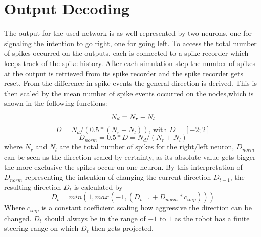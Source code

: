 \section{Output Decoding}\label{sec:OutputDecoding}
The output for the used network is as well represented by two neurons, one for signaling the intention to go right, one for going left. To access the total number of spikes occurred on the outputs, each is connected to a spike recorder which keeps track of the spike history.
After each simulation step the number of spikes at the output is retrieved from its spike recorder and the spike recorder gets reset. From the difference in spike events the general direction is derived. This is then scaled by the mean number of spike events occurred on the nodes,which is shown in the following functions:
\begin{equation}
  N_d = N_r - N_l \\
\end{equation}
\begin{equation}
  D = N_d / (0.5 * (N_r + N_l)) \text{, with $D=[-2;2]$} 
\end{equation}
\begin{equation}
  D_{norm} = 0.5 * D = N_d/(N_r+N_l) 
\end{equation}
where $N_r$ and $N_l$ are the total number of spikes for the right/left neuron, $D_{norm}$ can be seen as the direction scaled by certainty, as its absolute value gets bigger the more exclusive the spikes occur on one neuron. By this interpretation of $D_{norm}$ representing the intention of changing the current direction $D_{t-1}$, the resulting direction $D_t$ is calculated by 
\label{eg:OutputCalc}
\begin{equation}
  D_t = min(1,max(-1,( D_{t-1} + D_{norm} * c_{imp})))
\end{equation}
Where $c_{imp}$ is a constant coefficient scaling how aggressive the direction can be changed. $D_t$ should always be in the range of $-1$ to $1$ as the robot has a finite steering range on which $D_t$ then gets projected.

